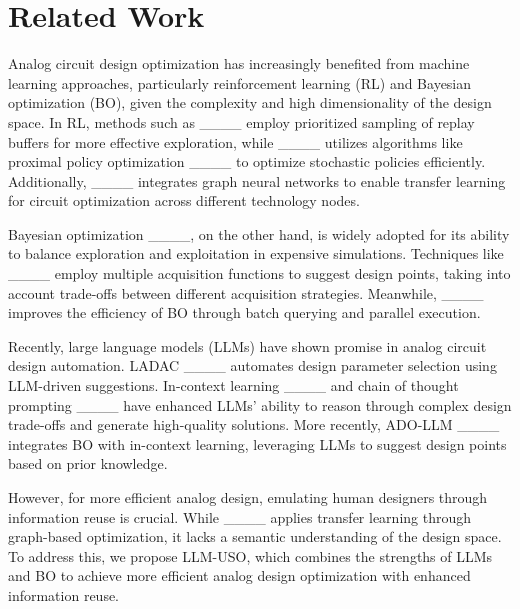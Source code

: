 \section{Related Work}
Analog circuit design optimization has increasingly benefited from machine learning approaches, particularly reinforcement learning (RL) and Bayesian optimization (BO), given the complexity and high dimensionality of the design space. In RL, methods such as ____ employ prioritized sampling of replay buffers for more effective exploration, while ____ utilizes algorithms like proximal policy optimization ____ to optimize stochastic policies efficiently. Additionally, ____ integrates graph neural networks to enable transfer learning for circuit optimization across different technology nodes.

Bayesian optimization ____, on the other hand, is widely adopted for its ability to balance exploration and exploitation in expensive simulations. Techniques like ____ employ multiple acquisition functions to suggest design points, taking into account trade-offs between different acquisition strategies. Meanwhile, ____ improves the efficiency of BO through batch querying and parallel execution.

Recently, large language models (LLMs) have shown promise in analog circuit design automation. LADAC ____ automates design parameter selection using LLM-driven suggestions. In-context learning ____ and chain of thought prompting ____ have enhanced LLMs’ ability to reason through complex design trade-offs and generate high-quality solutions. More recently, ADO-LLM ____ integrates BO with in-context learning, leveraging LLMs to suggest design points based on prior knowledge.

However, for more efficient analog design, emulating human designers through information reuse is crucial. While ____ applies transfer learning through graph-based optimization, it lacks a semantic understanding of the design space. To address this, we propose LLM-USO, which combines the strengths of LLMs and BO to achieve more efficient analog design optimization with enhanced information reuse.